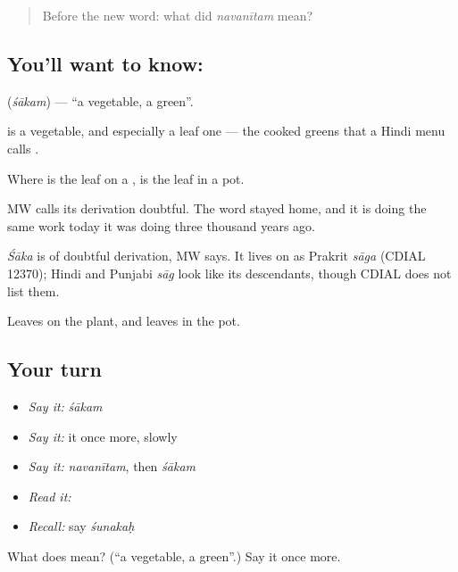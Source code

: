 \label{lesson:SA-C40-vegetable}



\begin{quote}
Before the new word: what did \emph{navanītam} mean?
\end{quote}

\subsection*{You'll want to know: }
\textbf{} (\emph{śākam}) — \textquotedblleft{}a vegetable, a green\textquotedblright{}.

\textbf{} is a vegetable, and especially a leaf one — the cooked greens that a Hindi menu calls .

Where  is the leaf on a , \textbf{} is the leaf in a pot.

MW calls its derivation doubtful. The word stayed home, and it is doing the same work today it was doing three thousand years ago.

\begin{cousinweb}
\emph{Śāka} is of doubtful derivation, MW says. It lives on as Prakrit \emph{sāga} (CDIAL 12370); Hindi and Punjabi \emph{sāg} look like its descendants, though CDIAL does not list them.
\end{cousinweb}

\begin{grammarlens}[title={What you've built}]
Leaves on the plant, and leaves in the pot.
\end{grammarlens}

\subsection*{Your turn}
\begin{itemize}
\raggedright
  \item \emph{Say it:} \emph{śākam}
  \item \emph{Say it:} it once more, slowly
  \item \emph{Say it:} \emph{navanītam}, then \emph{śākam}
  \item \emph{Read it:} \textbf{}
  \item \emph{Recall:} say \emph{śunakaḥ}
\end{itemize}

\begin{tcolorbox}[breakable,colback=teal!4,colframe=teal!35!black,title={Before you move on}]
What does  mean? (\textquotedblleft{}a vegetable, a green\textquotedblright{}.) Say it once more.
\end{tcolorbox}
